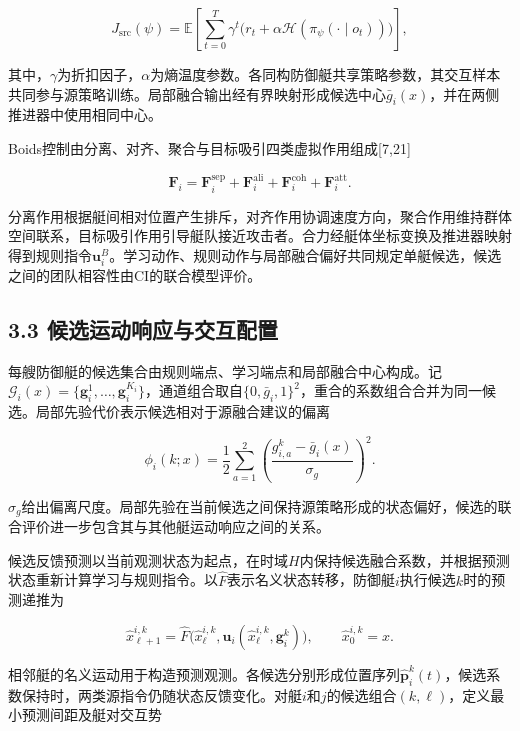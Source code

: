 \documentclass[UTF8,10.5pt,a4paper,fontset=none]{ctexart}
\begin{document}
\[
J_{\mathrm{src}}(\psi)=
\mathbb E\left[
\sum_{t=0}^{T}\gamma^t
\bigl(r_t+\alpha\mathcal H(\pi_\psi(\cdot\mid o_t))\bigr)
\right],
\tag{8}
\]

其中，\(\gamma\)为折扣因子，\(\alpha\)为熵温度参数。各同构防御艇共享策略参数，其交互样本共同参与源策略训练。局部融合输出经有界映射形成候选中心\(\bar g_i(x)\)，并在两侧推进器中使用相同中心。

Boids控制由分离、对齐、聚合与目标吸引四类虚拟作用组成{[}7,21{]}

\[
\boldsymbol F_i=
\boldsymbol F_i^{\mathrm{sep}}
+\boldsymbol F_i^{\mathrm{ali}}
+\boldsymbol F_i^{\mathrm{coh}}
+\boldsymbol F_i^{\mathrm{att}}.
\tag{9}
\]

分离作用根据艇间相对位置产生排斥，对齐作用协调速度方向，聚合作用维持群体空间联系，目标吸引作用引导艇队接近攻击者。合力经艇体坐标变换及推进器映射得到规则指令\(\boldsymbol u_i^B\)。学习动作、规则动作与局部融合偏好共同规定单艇候选，候选之间的团队相容性由CI的联合模型评价。

\subsection{3.3
候选运动响应与交互配置}\label{ux5019ux9009ux8fd0ux52a8ux54cdux5e94ux4e0eux4ea4ux4e92ux914dux7f6e}

每艘防御艇的候选集合由规则端点、学习端点和局部融合中心构成。记\(\mathcal G_i(x)=\{\boldsymbol g_i^1,\ldots,\boldsymbol g_i^{K_i}\}\)，通道组合取自\(\{0,\bar g_i,1\}^2\)，重合的系数组合合并为同一候选。局部先验代价表示候选相对于源融合建议的偏离

\[
\phi_i(k;x)=\frac{1}{2}\sum_{a=1}^{2}
\left(\frac{g_{i,a}^{k}-\bar g_i(x)}{\sigma_g}\right)^2.
\tag{10}
\]

\(\sigma_g\)给出偏离尺度。局部先验在当前候选之间保持源策略形成的状态偏好，候选的联合评价进一步包含其与其他艇运动响应之间的关系。

候选反馈预测以当前观测状态为起点，在时域\(H\)内保持候选融合系数，并根据预测状态重新计算学习与规则指令。以\(\widehat F\)表示名义状态转移，防御艇\(i\)执行候选\(k\)时的预测递推为

\[
\widehat x_{\ell+1}^{i,k}
=\widehat F\bigl(\widehat x_\ell^{i,k},
\boldsymbol u_i(\widehat x_\ell^{i,k},\boldsymbol g_i^k)\bigr),
\qquad \widehat x_0^{i,k}=x.
\tag{11}
\]

相邻艇的名义运动用于构造预测观测。各候选分别形成位置序列\(\widehat{\boldsymbol p}_i^k(t)\)，候选系数保持时，两类源指令仍随状态反馈变化。对艇\(i\)和\(j\)的候选组合\((k,\ell)\)，定义最小预测间距及艇对交互势
\end{document}
